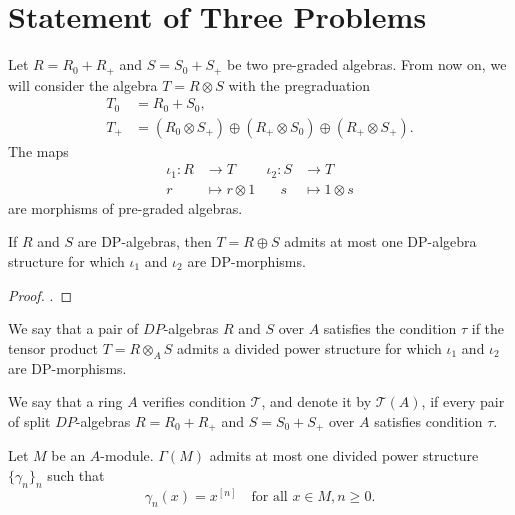 \section{Statement of Three Problems}
Let $R = R_0 + R_+$ and $S = S_0 + S_+$ be two pre-graded algebras. From now on, we will consider the algebra $T = R \otimes S$ with the pregraduation
\begin{align*}
	T_0 &= R_0 + S_0,\\
	T_+ &= (R_0 \otimes S_+) \oplus (R_+ \otimes S_0) \oplus (R_+ \otimes S_+).
\end{align*}
The maps
\begin{align*}
	\iota_1 : R &\to T &\iota_2 : S &\to T \\
			r &\mapsto r \otimes 1 &\quad s &\mapsto 1 \otimes s
\end{align*}
are morphisms of pre-graded algebras.

\begin{lemma}
	\label{lem:roby65-1}
	\leanok
	If $R$ and $S$ are DP-algebras, then $T = R \oplus S$ admits at most one DP-algebra structure for which $\iota_1$ and $\iota_2$ are DP-morphisms.
\end{lemma}

\begin{proof}\leanok
\cite[Lemme 1]{Roby65}.
\end{proof}

\begin{definition}
	\label{def:cond_tau}
	\leanok
	We say that a pair of $DP$-algebras $R$ and $S$ over $A$ satisfies the condition $\tau$ if the tensor product $T = R \otimes_A S$ admits a divided power structure for which  $\iota_1$ and $\iota_2$ are DP-morphisms.
\end{definition}

\begin{definition}
	\label{def:cond_T}
	\leanok
	We say that a ring $A$ verifies condition $\mathcal{T}$, and denote it by $\mathcal{T}(A)$, if every pair of split $DP$-algebras $R = R_0 + R_+$ and $S = S_0 + S_+$ over $A$ satisfies condition $\tau$.
\end{definition}

\begin{lemma}
	\label{lem:roby65-2}
	\leanok
	Let $M$ be an $A$-module. $\Gamma(M)$ admits at most one divided power structure $\{\gamma_n\}_n$ such that
	\[ \gamma_n(x) = x^{[n]} \quad\text{for all } x \in M, n \ge 0.  \]
\end{lemma}

